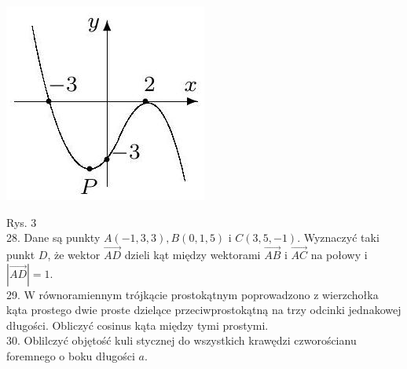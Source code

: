 \documentclass[10pt]{article}
\begin{document}
\includegraphics[max width=\textwidth, center]{2024_11_21_7f9effa233da5317fab2g-2(1)}

Rys. 3\\
28. Dane są punkty \(A(-1,3,3), B(0,1,5)\) i \(C(3,5,-1)\). Wyznaczyć taki punkt \(D\), że wektor \(\overrightarrow{A D}\) dzieli kąt między wektorami \(\overrightarrow{A B}\) i \(\overrightarrow{A C}\) na połowy i \(|\overrightarrow{A D}|=1\).\\
29. W równoramiennym trójkącie prostokątnym poprowadzono z wierzchołka kąta prostego dwie proste dzielące przeciwprostokątną na trzy odcinki jednakowej długości. Obliczyć cosinus kąta między tymi prostymi.\\
30. Oblilczyć objętość kuli stycznej do wszystkich krawędzi czworościanu foremnego o boku długości \(a\).
\end{document}
